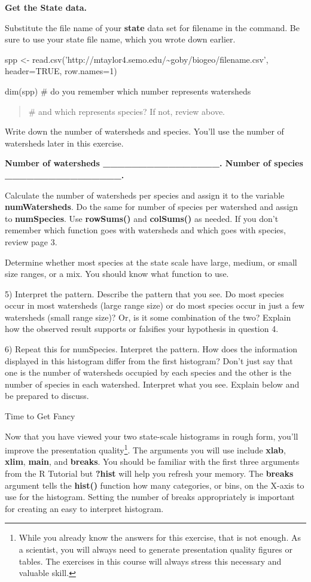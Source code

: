 \textbf{Get the State data.}

Substitute the file name of your \textbf{state} data set for filename in
the command. Be sure to use your state file name, which you wrote down
earlier.

spp \textless{}-
read.csv('http://mtaylor4.semo.edu/\textasciitilde{}goby/biogeo/filename.csv',
header=TRUE, row.names=1)

dim(spp) \# do you remember which number represents watersheds

\begin{quote}
\# and which represents species? If not, review above.
\end{quote}

Write down the number of watersheds and species. You'll use the number
of watersheds later in this exercise.

\textbf{Number of watersheds \_\_\_\_\_\_\_\_\_\_\_\_\_\_\_\_. Number of
species \_\_\_\_\_\_\_\_\_\_\_\_\_\_\_\_.}

Calculate the number of watersheds per species and assign it to the
variable \textbf{numWatersheds}. Do the same for number of species per
watershed and assign to \textbf{numSpecies}. Use \textbf{rowSums()} and
\textbf{colSums()} as needed. If you don't remember which function goes
with watersheds and which goes with species, review page 3.

Determine whether most species at the state scale have large, medium, or
small size ranges, or a mix. You should know what function to use.

5) Interpret the pattern. Describe the pattern that you see. Do most
species occur in most watersheds (large range size) or do most species
occur in just a few watersheds (small range size)? Or, is it some
combination of the two? Explain how the observed result supports or
falsifies your hypothesis in question 4.

6) Repeat this for numSpecies. Interpret the pattern. How does the
information displayed in this histogram differ from the first histogram?
Don't just say that one is the number of watersheds occupied by each
species and the other is the number of species in each watershed.
Interpret what you see. Explain below and be prepared to discuss.

Time to Get Fancy

Now that you have viewed your two state-scale histograms in rough form,
you'll improve the presentation quality\footnote{While you already know
  the answers for this exercise, that is not enough. As a scientist, you
  will always need to generate presentation quality figures or tables.
  The exercises in this course will always stress this necessary and
  valuable skill.}. The arguments you will use include \textbf{xlab},
\textbf{xlim}, \textbf{main}, and \textbf{breaks}. You should be
familiar with the first three arguments from the R Tutorial but
\textbf{?hist} will help you refresh your memory. The \textbf{breaks}
argument tells the \textbf{hist()} function how many categories, or
bins, on the X-axis to use for the histogram. Setting the number of
breaks appropriately is important for creating an easy to interpret
histogram.

